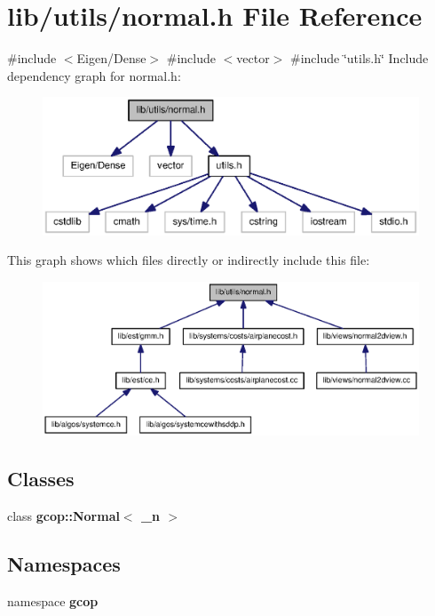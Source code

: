 \section{lib/utils/normal.h \-File \-Reference}
\label{normal_8h}
{\ttfamily \#include $<$\-Eigen/\-Dense$>$}\*
{\ttfamily \#include $<$vector$>$}\*
{\ttfamily \#include \char`\"{}utils.\-h\char`\"{}}\*
\-Include dependency graph for normal.\-h\-:\nopagebreak
\begin{figure}[H]
\begin{center}
\leavevmode
\includegraphics[width=350pt]{normal_8h__incl}
\end{center}
\end{figure}
\-This graph shows which files directly or indirectly include this file\-:\nopagebreak
\begin{figure}[H]
\begin{center}
\leavevmode
\includegraphics[width=350pt]{normal_8h__dep__incl}
\end{center}
\end{figure}
\subsection*{\-Classes}
\begin{DoxyCompactItemize}
\item 
class {\bf gcop\-::\-Normal$<$ \-\_\-n $>$}
\end{DoxyCompactItemize}
\subsection*{\-Namespaces}
\begin{DoxyCompactItemize}
\item 
namespace {\bf gcop}
\end{DoxyCompactItemize}
